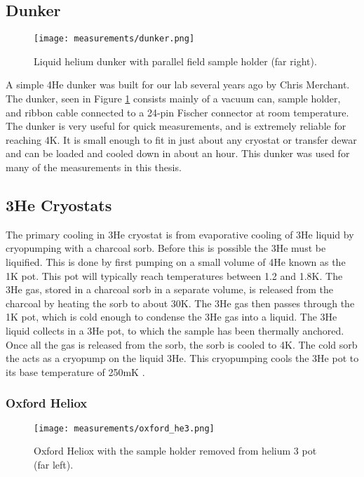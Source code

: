 \subsection{Dunker}

\begin{figure}
    \centering
    \texttt{[image: measurements/dunker.png]}
    \caption{Liquid helium dunker with parallel field sample holder (far right).}
    \label{fig:dunker}
\end{figure}

A simple 4He dunker was built for our lab several years ago by Chris Merchant. The dunker, seen in Figure \ref{fig:dunker} consists mainly of a vacuum can, sample holder, and ribbon cable connected to a 24-pin Fischer connector at room temperature. The dunker is very useful for quick measurements, and is extremely reliable for reaching 4K. It is small enough to fit in just about any cryostat or transfer dewar and can be loaded and cooled down in about an hour. This dunker was used for many of the measurements in this thesis.

\subsection{3He Cryostats}

The primary cooling in 3He cryostat is from evaporative cooling of 3He liquid by cryopumping with a charcoal sorb. Before this is possible the 3He must be liquified. This is done by first pumping on a small volume of 4He known as the 1K pot. This pot will typically reach temperatures between 1.2 and 1.8K. The 3He gas, stored in a charcoal sorb in a separate volume, is released from the charcoal by heating the sorb to about 30K. The 3He gas then passes through the 1K pot, which is cold enough to condense the 3He gas into a liquid. The 3He liquid collects in a 3He pot, to which the sample has been thermally anchored. Once all the gas is released from the sorb, the sorb is cooled to 4K. The cold sorb the acts as a cryopump on the liquid 3He. This cryopumping cools the 3He pot to its base temperature of 250mK \cite{Balshaw2001}.

\subsubsection*{Oxford Heliox}

\begin{figure}
    \centering
    \texttt{[image: measurements/oxford\_he3.png]}
    \caption{Oxford Heliox with the sample holder removed from helium 3 pot (far left).}
    \label{fig:heliox}
\end{figure}

